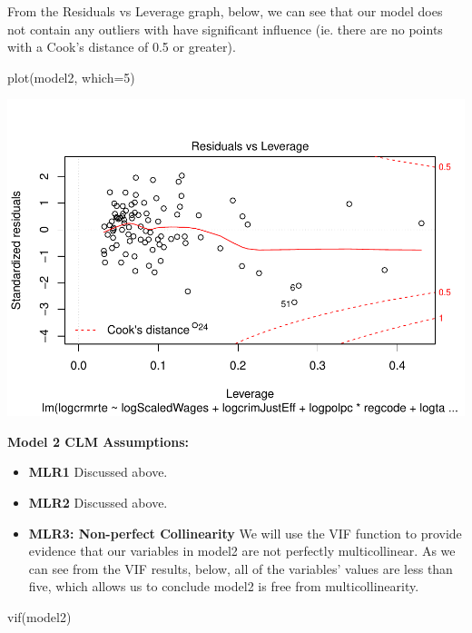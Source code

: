 \documentclass[]{article}
\newenvironment{Shaded}{}{}
\newcommand{\DataTypeTok}[1]{#1}
\newcommand{\DecValTok}[1]{#1}
\newcommand{\KeywordTok}[1]{\textcolor[rgb]{0.00,0.00,1.00}{#1}}
\newcommand{\NormalTok}[1]{#1}
\begin{document}
From the Residuals vs Leverage graph, below, we can see that our model
does not contain any outliers with have significant influence (ie. there
are no points with a Cook's distance of 0.5 or greater).

\begin{Shaded}
\begin{Highlighting}[]
\KeywordTok{plot}\NormalTok{(model2, }\DataTypeTok{which=}\DecValTok{5}\NormalTok{)}
\end{Highlighting}
\end{Shaded}

\includegraphics{Bagnard_Gaustad_Hartman_Leung_Lab_3_files/figure-latex/unnamed-chunk-71-1.pdf}

\textbf{Model 2 CLM Assumptions:}

\begin{itemize}
\item
  \textbf{MLR1} Discussed above.
\item
  \textbf{MLR2} Discussed above.
\item
  \textbf{MLR3: Non-perfect Collinearity} We will use the VIF function
  to provide evidence that our variables in model2 are not perfectly
  multicollinear. As we can see from the VIF results, below, all of the
  variables' values are less than five, which allows us to conclude
  model2 is free from multicollinearity.
\end{itemize}

\begin{Shaded}
\begin{Highlighting}[]
\KeywordTok{vif}\NormalTok{(model2)}
\end{Highlighting}
\end{Shaded}
\end{document}

